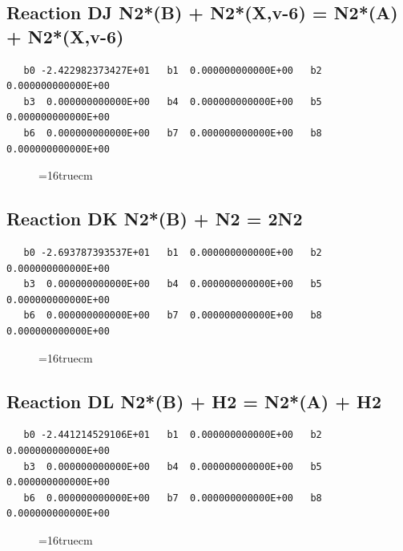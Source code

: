 \documentclass[12pt,dvipdfm]{article}
\begin{document}
\subsection{
Reaction DJ N2*(B) + N2*(X,v-6) = N2*(A) + N2*(X,v-6) }
\begin{small}\begin{verbatim}
   b0 -2.422982373427E+01   b1  0.000000000000E+00   b2  0.000000000000E+00
   b3  0.000000000000E+00   b4  0.000000000000E+00   b5  0.000000000000E+00
   b6  0.000000000000E+00   b7  0.000000000000E+00   b8  0.000000000000E+00
\end{verbatim}\end{small}
\begin{figure}[h!] \label{n2rates}
\epsfxsize=16truecm
\end{figure}
\newpage

\subsection{
Reaction DK N2*(B) + N2 = 2N2 }
\begin{small}\begin{verbatim}
   b0 -2.693787393537E+01   b1  0.000000000000E+00   b2  0.000000000000E+00
   b3  0.000000000000E+00   b4  0.000000000000E+00   b5  0.000000000000E+00
   b6  0.000000000000E+00   b7  0.000000000000E+00   b8  0.000000000000E+00
\end{verbatim}\end{small}
\begin{figure}[h!] \label{n2rates}
\epsfxsize=16truecm
\end{figure}
\newpage

\subsection{
Reaction DL N2*(B) + H2 = N2*(A) + H2 }
\begin{small}\begin{verbatim}
   b0 -2.441214529106E+01   b1  0.000000000000E+00   b2  0.000000000000E+00
   b3  0.000000000000E+00   b4  0.000000000000E+00   b5  0.000000000000E+00
   b6  0.000000000000E+00   b7  0.000000000000E+00   b8  0.000000000000E+00
\end{verbatim}\end{small}
\begin{figure}[h!] \label{n2rates}
\epsfxsize=16truecm
\end{figure}
\newpage
\end{document}
